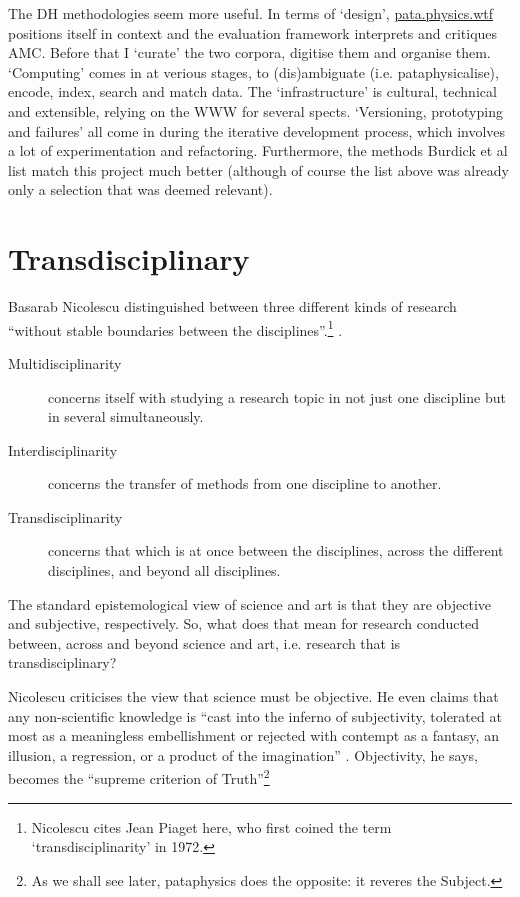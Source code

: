 The \ac{DH} methodologies seem more useful. In terms of `design', \url{pata.physics.wtf} positions itself in context and the evaluation framework interprets and critiques \ac{AMC}. Before that I `curate' the two corpora, digitise them and organise them. `Computing' comes in at verious stages, to (dis)ambiguate (i.e. pataphysicalise), encode, index, search and match data. The `infrastructure' is cultural, technical and extensible, relying on the \ac{WWW} for several spects. `Versioning, prototyping and failures' all come in during the iterative development process, which involves a lot of experimentation and refactoring. Furthermore, the methods Burdick et al \autocite*{Burdick2012} list match this project much better (although of course the list above was already only a selection that was deemed relevant).


\section{Transdisciplinary}

Basarab Nicolescu distinguished between three different kinds of research ``without stable boundaries between the disciplines''.\footnote{Nicolescu cites Jean Piaget here, who first coined the term `transdisciplinarity' in 1972.} \autocite*{Nicolescu2010}.

\begin{description}
  \item [Multidisciplinarity]	concerns itself with studying a research topic in not just one discipline but in several simultaneously.
  \item [Interdisciplinarity]	concerns the transfer of methods from one discipline to another.
  \item [Transdisciplinarity]	concerns that which is at once between the disciplines, across the different disciplines, and beyond all disciplines.
\end{description}

The standard epistemological view of science and art is that they are objective and subjective, respectively. So, what does that mean for research conducted between, across and beyond science and art, i.e. research that is transdisciplinary?

Nicolescu criticises the view that science must be objective. He even claims that any non-scientific knowledge is ``cast into the inferno of subjectivity, tolerated at most as a meaningless embellishment or rejected with contempt as a fantasy, an illusion, a regression, or a product of the imagination'' \autocite*{Nicolescu2010}. Objectivity, he says, becomes the ``supreme criterion of Truth''\footnote{As we shall see later, pataphysics does the opposite: it reveres the Subject.}

